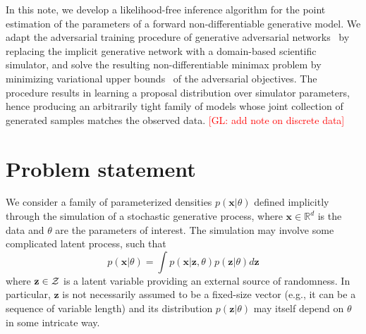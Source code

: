 \documentclass[twocolumn,superscriptaddress,aps]{revtex4-1}
\newcommand{\glnote}[1]{\textcolor{red}{[GL: #1]}}
\theoremstyle{plain}
\begin{document}
In this note, we develop a likelihood-free inference algorithm for the point
estimation of the parameters of a forward non-differentiable
generative model. We adapt the adversarial
training procedure of generative adversarial
networks~\cite{goodfellow2014generative} by replacing the implicit generative
network with a domain-based scientific simulator, and solve the resulting
non-differentiable minimax problem by minimizing variational upper
bounds~\citep{2011arXiv1106.4487W,2012arXiv1212.4507S} of the adversarial
objectives. The procedure results in learning a proposal distribution over
simulator parameters, hence producing an arbitrarily tight family of models whose
joint collection of generated samples matches the observed data.
\glnote{add note on discrete data}



\section{Problem statement}
\label{sec:problem}

We consider a family of parameterized densities $p(\mathbf{x}|\theta)$
defined implicitly through the simulation of a stochastic generative process,
where $\mathbf{x} \in \mathbb{R}^d$ is the data and $\theta$ are the
parameters of interest. The simulation may involve some complicated latent
process, such that
\begin{equation}\label{eqn:p_x}
    p(\mathbf{x}|\theta) = \int p(\mathbf{x}|\mathbf{z},\theta) p(\mathbf{z}|\theta) d\mathbf{z}
\end{equation}
where $\mathbf{z} \in {\cal Z}$ is a latent variable providing an external
source of randomness. In particular, $\mathbf{z}$ is not necessarily assumed to
be a fixed-size vector (e.g., it can be a sequence of variable length) and its
distribution $p(\mathbf{z}|\theta)$ may itself depend on $\theta$ in some intricate way.
\end{document}
